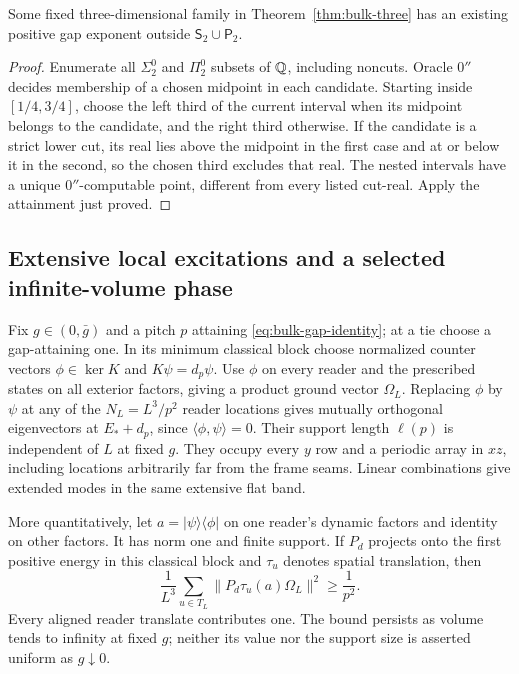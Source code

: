 \begin{corollary}\label{cor:bulk-beyond-sides}
Some fixed three-dimensional family in Theorem~\ref{thm:bulk-three}
has an existing positive gap exponent outside
$\mathsf S_2\cup\mathsf P_2$.
\end{corollary}
\begin{proof}
Enumerate all $\Sigma^0_2$ and $\Pi^0_2$ subsets of $\mathbb Q$, including
noncuts. Oracle $0''$ decides membership of a chosen midpoint in
each candidate. Starting inside $[1/4,3/4]$, choose the left third
of the current interval when its midpoint belongs to the candidate,
and the right third otherwise. If the candidate is a strict lower
cut, its real lies above the midpoint in the first case and at or
below it in the second, so the chosen third excludes that real.
The nested intervals have a unique $0''$-computable point, different
from every listed cut-real. Apply the attainment just proved.
\end{proof}

\subsection{Extensive local excitations and a selected infinite-volume phase}
Fix $g\in(0,\bar g)$ and a pitch $p$ attaining
\eqref{eq:bulk-gap-identity}; at a tie choose a gap-attaining one.
In its minimum classical block choose normalized counter vectors
$\phi\in\ker K$ and $K\psi=d_p\psi$. Use $\phi$ on every reader
and the prescribed states on all exterior factors, giving a product
ground vector $\Omega_L$. Replacing $\phi$ by $\psi$ at any of the
$N_L=L^3/p^2$ reader locations gives mutually orthogonal eigenvectors
at $E_*+d_p$, since $\langle\phi,\psi\rangle=0$. Their support
length $\ell(p)$ is independent of $L$ at fixed $g$. They occupy
every $y$ row and a periodic array in $xz$, including locations
arbitrarily far from the frame seams. Linear combinations give
extended modes in the same extensive flat band.

More quantitatively, let $a=|\psi\rangle\langle\phi|$ on one
reader's dynamic factors and identity on other factors. It has
norm one and finite support. If $P_d$ projects onto the first
positive energy in this classical block and $\tau_u$ denotes
spatial translation, then
\begin{equation}\label{eq:bulk-local-weight}
 \frac1{L^3}\sum_{u\in T_L}
       \|P_d\tau_u(a)\Omega_L\|^2\geq\frac1{p^2}.
\end{equation}
Every aligned reader translate contributes one. The bound persists
as volume tends to infinity at fixed $g$; neither its value nor the
support size is asserted uniform as $g\downarrow0$.

